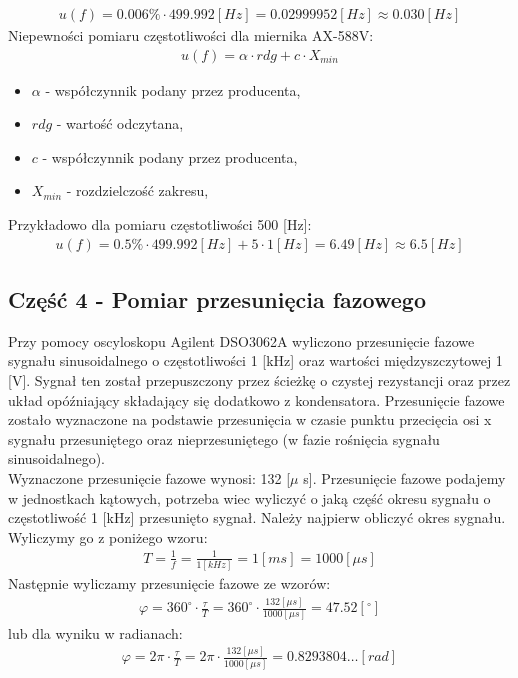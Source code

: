 \documentclass[11pt]{article}
\begin{document}
    \begin{gather*}
        u(f)=0.006\%\cdot 499.992 [Hz]=0.02999952 [Hz]\approx 0.030 [Hz]
    \end{gather*}
    \noindent Niepewności pomiaru częstotliwości dla miernika AX-588V:
    \begin{gather*}
        u(f)=\alpha\cdot rdg+ c\cdot X_{min}
    \end{gather*}
    {\footnotesize
        \begin{itemize}
            \setlength\itemsep{0em}
            \item[] \boldmath$\alpha$ - współczynnik podany przez producenta,
            \item[] \boldmath$rdg$ - wartość odczytana,
            \item[] \boldmath$c$ - współczynnik podany przez producenta,
            \item[] \boldmath$X_{min}$ -  rozdzielczość zakresu,
        \end{itemize}}
    \noindent Przykładowo dla pomiaru częstotliwości 500 [Hz]:
    \begin{gather*}
        u(f)=0.5\%\cdot 499.992 [Hz]+5\cdot 1 [Hz]=6.49[Hz]\approx 6.5 [Hz]
    \end{gather*}
    \newpage
    \subsection*{Część 4 - Pomiar przesunięcia fazowego}
    Przy pomocy oscyloskopu Agilent DSO3062A wyliczono przesunięcie fazowe sygnału sinusoidalnego o częstotliwości 1 [kHz] oraz wartości międzyszczytowej 1 [V]. Sygnał ten został
    przepuszczony przez ścieżkę o czystej rezystancji oraz przez układ opóźniający składający się dodatkowo z kondensatora. Przesunięcie fazowe zostało wyznaczone na podstawie
    przesunięcia w czasie punktu przecięcia osi x sygnału przesuniętego oraz nieprzesuniętego (w fazie rośnięcia sygnału sinusoidalnego).\\
    \indent Wyznaczone przesunięcie fazowe wynosi: 132 [$\mu$ s].
    Przesunięcie fazowe podajemy w jednostkach kątowych, potrzeba wiec wyliczyć o jaką część okresu sygnału o częstotliwość 1 [kHz] przesunięto sygnał. Należy najpierw obliczyć
    okres sygnału. Wyliczymy go z poniżego wzoru:
    \begin{gather*}
        T=\frac{1}{f}=\frac{1}{1[kHz]}=1 [ms]=1000[\mu s]
    \end{gather*}
    Następnie wyliczamy przesunięcie fazowe ze wzorów:
    \begin{gather*}
        \varphi=360^{\circ}\cdot\frac{\tau}{T}=360^{\circ}\cdot\frac{132 [\mu s]}{1000 [\mu s]}=47.52 [^{\circ}]
    \end{gather*}
    lub dla wyniku w radianach:
    \begin{gather*}
        \varphi=2\pi\cdot\frac{\tau}{T}=2\pi\cdot\frac{132 [\mu s]}{1000 [\mu s]}=0.8293804\dots [rad]
    \end{gather*}
\end{document}
